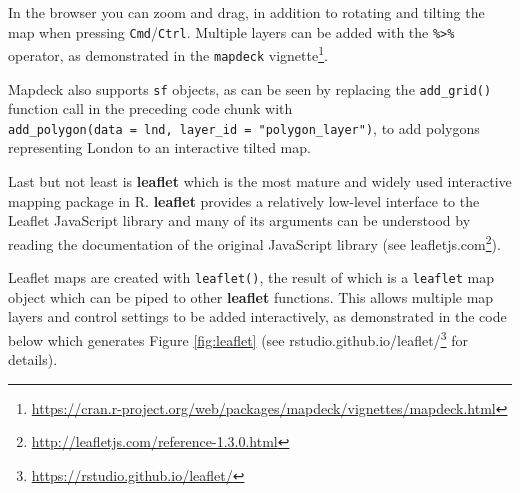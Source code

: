 \documentclass[]{krantz}
\newenvironment{Shaded}{\begin{snugshade}}{\end{snugshade}}
\newcommand{\DataTypeTok}[1]{\textcolor[rgb]{0.27,0.27,0.27}{#1}}
\newcommand{\DecValTok}[1]{\textcolor[rgb]{0.06,0.06,0.06}{#1}}
\newcommand{\FloatTok}[1]{\textcolor[rgb]{0.06,0.06,0.06}{#1}}
\newcommand{\KeywordTok}[1]{\textcolor[rgb]{0.27,0.27,0.27}{\textbf{#1}}}
\newcommand{\NormalTok}[1]{#1}
\newcommand{\OperatorTok}[1]{\textcolor[rgb]{0.43,0.43,0.43}{\textbf{#1}}}
\newcommand{\OtherTok}[1]{\textcolor[rgb]{0.37,0.37,0.37}{#1}}
\newcommand{\StringTok}[1]{\textcolor[rgb]{0.5,0.5,0.5}{#1}}
\let\rmarkdownfootnote\footnote%
\def\footnote{\protect\rmarkdownfootnote}
\renewcommand{\href}[2]{#2\footnote{\url{#1}}}
\begin{document}
In the browser you can zoom and drag, in addition to rotating and tilting the map when pressing \texttt{Cmd}/\texttt{Ctrl}.
Multiple layers can be added with the \texttt{\%\textgreater{}\%} operator, as demonstrated in the \href{https://cran.r-project.org/web/packages/mapdeck/vignettes/mapdeck.html}{\texttt{mapdeck} vignette}.

Mapdeck also supports \texttt{sf} objects, as can be seen by replacing the \texttt{add\_grid()} function call in the preceding code chunk with \texttt{add\_polygon(data\ =\ lnd,\ layer\_id\ =\ "polygon\_layer")}, to add polygons representing London to an interactive tilted map.

Last but not least is \textbf{leaflet} which is the most mature and widely used interactive mapping package in R.
\textbf{leaflet} provides a relatively low-level interface to the Leaflet JavaScript library and many of its arguments can be understood by reading the documentation of the original JavaScript library (see \href{http://leafletjs.com/reference-1.3.0.html}{leafletjs.com}).

Leaflet maps are created with \texttt{leaflet()}, the result of which is a \texttt{leaflet} map object which can be piped to other \textbf{leaflet} functions.
This allows multiple map layers and control settings to be added interactively, as demonstrated in the code below which generates Figure \ref{fig:leaflet} (see \href{https://rstudio.github.io/leaflet/}{rstudio.github.io/leaflet/} for details).

\begin{Shaded}
\end{Shaded}
\end{document}
